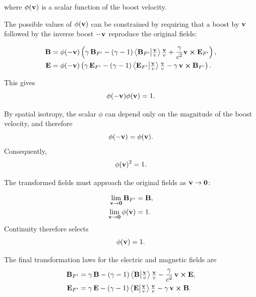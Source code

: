 \documentclass[12pt]{article}
\begin{document}
where $\phi(\vb{v})$ is a scalar function of the boost velocity.

The possible values of $\phi(\vb{v})$ can be constrained by requiring that a boost by
$\vb{v}$ followed by the inverse boost $-\vb{v}$ reproduce the original fields:

\begin{align}
  \vb{B}
  &=
  \phi(-\vb{v})\left(
      \gamma\,\vb{B}_{F'}
      -
      (\gamma-1)
      \ip{\vb{B}_{F'}}{\tfrac{\vb{v}}{v}}
      \tfrac{\vb{v}}{v}
      +
      \frac{\gamma}{c^2}\vb{v}\cross\vb{E}_{F'}
    \right),
  \\
  \vb{E}
  &=
  \phi(-\vb{v})\left(
      \gamma\,\vb{E}_{F'}
      -
      (\gamma-1)
      \ip{\vb{E}_{F'}}{\tfrac{\vb{v}}{v}}
      \tfrac{\vb{v}}{v}
      -
      \gamma\,\vb{v}\cross\vb{B}_{F'}
    \right).
\end{align}

This gives
\[
  \phi(-\vb{v})\phi(\vb{v})=1.
\]

By spatial isotropy, the scalar $\phi$ can depend only on the magnitude of the boost
velocity, and therefore
\[
  \phi(-\vb{v})=\phi(\vb{v}).
\]
Consequently,
\[
  \phi(\vb{v})^2=1.
\]

The transformed fields must approach the original fields as $\vb{v}\to\vb{0}$:

\begin{align}
  \lim_{\vb{v}\to\vb{0}}\vb{B}_{F'} &= \vb{B},
  \\
  \lim_{\vb{v}\to\vb{0}}\phi(\vb{v}) &= 1.
\end{align}
Continuity therefore selects
\[
  \phi(\vb{v})=1.
\]

The final transformation laws for the electric and magnetic fields are
\begin{equation}
  \begin{aligned}
    \vb{B}_{F'}
    &=
    \gamma\,\vb{B}
    -
    (\gamma-1)
    \ip{\vb{B}}{\tfrac{\vb{v}}{v}}
    \tfrac{\vb{v}}{v}
    -
    \frac{\gamma}{c^2}\,
    \vb{v}\cross\vb{E},
    \\
    \vb{E}_{F'}
    &=
    \gamma\,\vb{E}
    -
    (\gamma-1)
    \ip{\vb{E}}{\tfrac{\vb{v}}{v}}
    \tfrac{\vb{v}}{v}
    -
    \gamma\,\vb{v}\cross\vb{B}.
  \end{aligned}
  \label{eq:relativistic_maxwell}
\end{equation}
\end{document}
